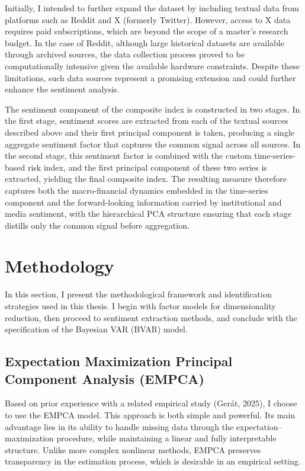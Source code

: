 \documentclass[12pt,a4paper]{report}
\begin{document}
Initially, I intended to further expand the dataset by including textual data from platforms such as Reddit and X (formerly Twitter). However, access to X data requires paid subscriptions, which are beyond the scope of a master's research budget. In the case of Reddit, although large historical datasets are available through archived sources, the data collection process proved to be computationally intensive given the available hardware constraints. Despite these limitations, such data sources represent a promising extension and could further enhance the sentiment analysis.

The sentiment component of the composite index is constructed in two stages. In the first stage, sentiment scores are extracted from each of the textual sources described above and their first principal component is taken, producing a single aggregate sentiment factor that captures the common signal across all sources. In the second stage, this sentiment factor is combined with the custom time-series-based risk index, and the first principal component of these two series is extracted, yielding the final composite index. The resulting measure therefore captures both the macro-financial dynamics embedded in the time-series component and the forward-looking information carried by institutional and media sentiment, with the hierarchical PCA structure ensuring that each stage distills only the common signal before aggregation.



\section{Methodology}
In this section, I present the methodological framework and identification strategies used in this thesis. I begin with factor models for dimensionality reduction, then proceed to sentiment extraction methods, and conclude with the specification of the Bayesian VAR (BVAR) model.

\subsection{Expectation Maximization Principal Component Analysis (EMPCA)}

Based on prior experience with a related empirical study (Gerát, 2025), I choose to use the EMPCA model. This approach is both simple and powerful. Its main advantage lies in its ability to handle missing data through the expectation–maximization procedure, while maintaining a linear and fully interpretable structure. Unlike more complex nonlinear methods, EMPCA preserves transparency in the estimation process, which is desirable in an empirical setting.
\end{document}
